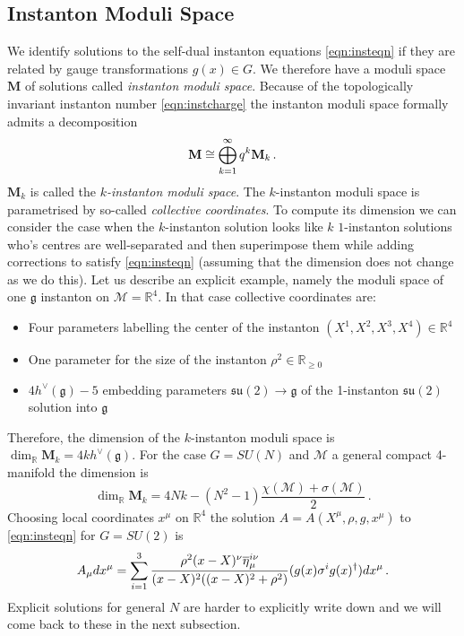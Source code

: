 \documentclass[main.tex]{subfiles}
\begin{document}
\subsection{Instanton Moduli Space}
We identify solutions to the self-dual instanton equations \eqref{eqn:insteqn} if they are related by gauge transformations $g(x)\in G$.  We therefore have a moduli space $\mathbf{M}$ of solutions called \textit{instanton moduli space}.  Because of the topologically invariant instanton number \eqref{eqn:instcharge} the instanton moduli space formally admits a decomposition 
\begin{equation}
\mathbf{M}\cong \bigoplus_{k=1}^{\infty}q^k\mathbf{M}_k\,.
\end{equation}
$\mathbf{M}_k$ is called the \textit{$k$-instanton moduli space}.  The $k$-instanton moduli space is parametrised by so-called \textit{collective coordinates}.  To compute its dimension we can consider the case when the $k$-instanton solution looks like $k$ $1$-instanton solutions who's centres are well-separated and then superimpose them while adding corrections to satisfy \eqref{eqn:insteqn} (assuming that the dimension does not change as we do this).  Let us describe an explicit example, namely the moduli space of one $\mathfrak{g}$ instanton on $\mathcal{M}=\mathbb{R}^4$.  In that case collective coordinates are:
\begin{itemize}
\item Four parameters labelling the center of the instanton $(X^1,X^2,X^3,X^4)\in\mathbb{R}^4$
\item One parameter for the size of the instanton $\rho^2\in\mathbb{R}_{\geq0}$
\item $4h^{\vee}(\mathfrak{g})-5$ embedding parameters $\mathfrak{su}(2)\to\mathfrak{g}$ of the 1-instanton $\mathfrak{su}(2)$ solution into $\mathfrak{g}$
\end{itemize}
Therefore, the dimension of the $k$-instanton moduli space is $\dim_{\mathbb{R}}\mathbf{M}_k=4kh^{\vee}(\mathfrak{g})$.
For the case $G=SU(N)$ and $\mathcal{M}$ a general compact 4-manifold the dimension is \cite{Atiyah:1978wi}
\begin{equation}
\dim_{\mathbb{R}}\mathbf{M}_k=4Nk-(N^2-1)\frac{\chi(\mathcal{M})+\sigma(\mathcal{M})}{2}\,.
\end{equation}
Choosing local coordinates $x^{\mu}$ on $\mathbb{R}^4$ the solution $A=A(X^{\mu},\rho,g,x^{\mu})$ to \eqref{eqn:insteqn} for $G=SU(2)$ is
\begin{equation}
A_{\mu}d x^{\mu}=\sum_{i=1}^3\frac{\rho^2(x-X)^{\nu}\overline{\eta}^{i\nu}_{\mu}}{(x-X)^2((x-X)^2+\rho^2)}(g(x)\sigma^ig(x)^{\dagger})d x^{\mu}\,.
\end{equation}
Explicit solutions for general $N$ are harder to explicitly write down and we will come back to these in the next subsection.
\end{document}
